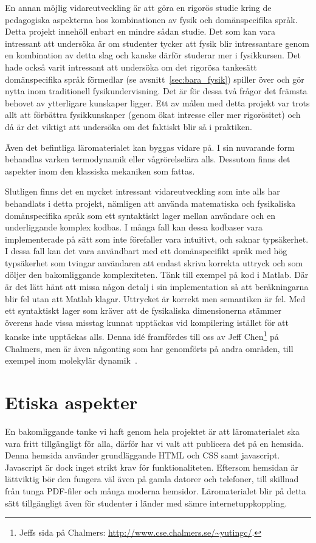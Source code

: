 En annan möjlig vidareutveckling är att göra en rigorös studie kring de
pedagogiska aspekterna hos kombinationen av fysik och domänspecifika språk.
Detta projekt innehöll enbart en mindre sådan studie. Det som kan vara
intressant att undersöka är om studenter tycker att fysik blir intressantare
genom en kombination av detta slag och kanske därför studerar mer i fysikkursen.
Det hade också varit intressant att undersöka om det rigorösa tankesätt
domänspecifika språk förmedlar (se avsnitt~\ref{sec:bara_fysik}) spiller över och
gör nytta inom traditionell fysikundervisning. Det är för dessa två frågor det
främsta behovet av ytterligare kunskaper ligger. Ett av målen med detta projekt var trots allt att förbättra fysikkunskaper (genom ökat intresse eller mer
rigorösitet) och då är det viktigt att undersöka om det faktiskt blir
så i praktiken.

Även det befintliga läromaterialet kan byggas vidare på. I sin nuvarande
form behandlas varken termodynamik eller vågrörelselära alls. Dessutom
finns det aspekter inom den klassiska mekaniken som fattas.

Slutligen finns det en mycket intressant vidareutveckling som inte alls har
behandlats i detta projekt, nämligen att använda matematiska och fysikaliska domänspecifika språk som
ett syntaktiskt lager mellan användare och en underliggande komplex kodbas. I
många fall kan dessa kodbaser vara implementerade på sätt som inte förefaller vara intuitivt, och saknar
typsäkerhet. I dessa fall kan det vara användbart med ett
domänspecifikt språk med hög typsäkerhet som tvingar användaren att
endast skriva korrekta uttryck och som döljer den bakomliggande komplexiteten. Tänk till exempel på kod i Matlab. Där är det lätt hänt att missa någon detalj i sin implementation så att beräkningarna blir fel utan att Matlab klagar. Uttrycket är korrekt men semantiken är fel. Med ett syntaktiskt lager som kräver att de fysikaliska dimensionerna stämmer överens hade vissa misstag kunnat upptäckas vid kompilering istället för att kanske inte upptäckas alls. Denna idé framfördes till oss av Jeff Chen\footnote{Jeffs sida på Chalmers:
\url{http://www.cse.chalmers.se/\~yutingc/}.}
på Chalmers, men är även någonting som har genomförts på andra områden, till
exempel inom molekylär dynamik~\cite{MD}.

\section{Etiska aspekter}

En bakomliggande tanke vi haft genom hela projektet är att läromaterialet ska
vara fritt tillgängligt för alla, därför har vi valt att publicera det på en
hemsida.  Denna hemsida använder grundläggande HTML och CSS samt javascript.
Javascript är dock inget strikt krav för funktionaliteten. Eftersom hemsidan är
lättviktig bör den fungera väl även på gamla datorer och telefoner, till
skillnad från tunga PDF-filer och många moderna hemsidor. Läromaterialet blir på
detta sätt tillgängligt även för studenter i länder med sämre
internetuppkoppling.

